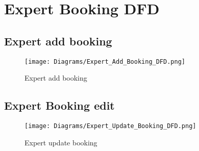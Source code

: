 \documentclass[12pt,a4paper]{article}
\begin{document}
	
 
 \clearpage
\section{Expert Booking DFD}
\subsection{Expert add booking}
\begin{figure}[th]
    \centering
   \texttt{[image: Diagrams/Expert\_Add\_Booking\_DFD.png]}
    \caption{Expert add booking }
    \label{fig:enter-label}
\end{figure}
\newpage
\subsection{Expert Booking edit}
\begin{figure}[th]
    \centering
   \texttt{[image: Diagrams/Expert\_Update\_Booking\_DFD.png]}
    \caption{Expert update booking }

\end{figure}
\end{document}
